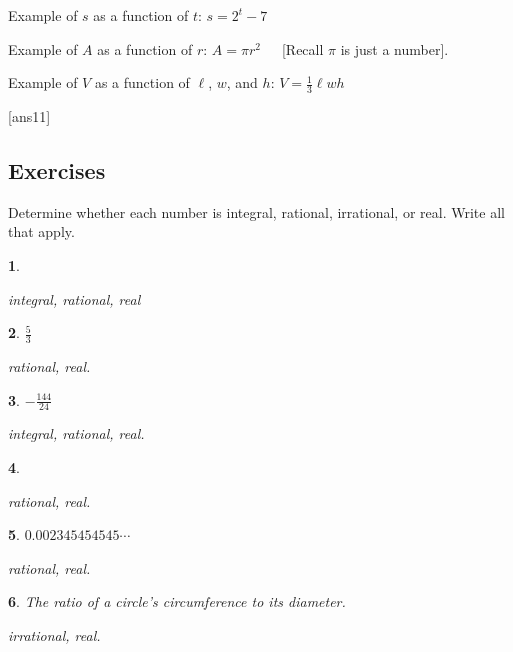 \documentclass{amsbook}
\newtheorem{exc}{}
\newenvironment{ex}{\begin{exc}\normalfont}{\end{exc}}
\numberwithin{section}{chapter}
\numberwithin{equation}{chapter}
\begin{document}
Example of $s$ as a function of $t$: $s = 2^{t}-7$


Example of $A$ as a function of $r$: $A=\pi r^2$\ \  \ [Recall $\pi$ is just a number].


Example of $V$ as a function of $\ell$, $w$, and $h$: $V = \frac{1}{3}\ell w h$




[ans11]
\subsection*{Exercises \nopunct} \hfill

Determine whether each number is integral, rational, irrational, or real. Write all that apply.
\begin{multicols}{2}

\begin{ex}
	17
	\begin{sol}
		integral, rational, real
	\end{sol}
\end{ex}


\begin{ex}
	$\frac{5}{3}$
	\begin{sol}
		rational, real.
	\end{sol}
\end{ex}


\begin{ex}
	$-\frac{144}{24}$
	\begin{sol}
		integral, rational, real.
	\end{sol}
\end{ex}

\begin{ex}
	-7.9
	\begin{sol}
		rational, real.
	\end{sol}
\end{ex}


\begin{ex}
	$0.002345454545\cdots$
	\begin{sol}
		rational, real.
	\end{sol}
\end{ex}


\begin{ex}
	The ratio of a circle's circumference to its diameter.
	\begin{sol}
		irrational, real.
	\end{sol}
\end{ex}
\end{multicols}
\end{document}
